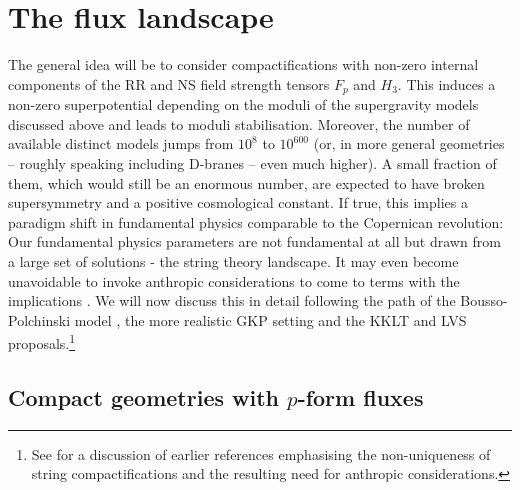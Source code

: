 \documentclass[12pt]{article}
\numberwithin{equation}{section}
\begin{document}
\section{The flux landscape}\label{tfl}

The general idea will be to consider compactifications with non-zero internal components of the RR and NS field strength tensors $F_p$ and $H_3$. This induces a non-zero superpotential depending on the moduli of the supergravity models discussed above and leads to moduli stabilisation. Moreover, the number of available distinct models jumps from $10^8$ to $10^{600}$ (or, in more general geometries -- roughly speaking including D-branes -- even much higher). A small fraction of them, which would still be an enormous number, are expected to have broken supersymmetry and a positive cosmological constant.
If true, this implies a paradigm shift in fundamental physics  comparable to the Copernican revolution: Our fundamental  physics parameters are not fundamental at all but drawn from a large set of solutions - the string theory landscape.
It may even become unavoidable to invoke anthropic considerations to come to terms with the implications \cite{Susskind:2003kw}. We will now discuss this in detail following the path of the Bousso-Polchinski model \cite{Bousso:2000xa}, the more realistic GKP setting \cite{Giddings:2001yu} and the KKLT \cite{Kachru:2003aw} and LVS \cite{Balasubramanian:2005zx} proposals.\footnote{See \cite{Schellekens:2006xz} for a discussion of earlier references emphasising the non-uniqueness of string compactifications and the resulting need for anthropic considerations.}





\subsection{Compact geometries with $p$-form fluxes}\label{cgwf}
\end{document}
